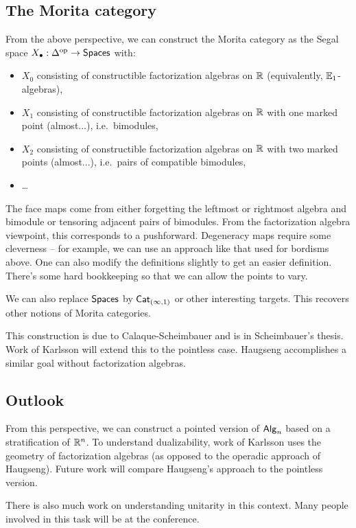 \subsection{The Morita category}

From the above perspective, we can construct the Morita category as the Segal space $X_\bullet: \Delta^{\mathrm{op}} \to \mathsf{Spaces}$ with:
\begin{itemize}
	\item $X_0$ consisting of constructible factorization algebras on $\mathbb{R}$ (equivalently, $\mathbb{E}_1$-algebras),
	\item $X_1$ consisting of constructible factorization algebras on $\mathbb{R}$ with one marked point (almost...), i.e.\ bimodules,
	\item $X_2$ consisting of constructible factorization algebras on $\mathbb{R}$ with two marked points (almost...), i.e.\ pairs of compatible bimodules,
	\item \dots
\end{itemize}
The face maps come from either forgetting the leftmost or rightmost algebra and bimodule or tensoring adjacent pairs of bimodules.
From the factorization algebra viewpoint, this corresponds to a pushforward.
Degeneracy maps require some cleverness -- for example, we can use an approach like that used for bordisms above.
One can also modify the definitions slightly to get an easier definition.
There's some hard bookkeeping so that we can allow the points to vary.

We can also replace $\mathsf{Spaces}$ by $\mathsf{Cat}_{(\infty,1)}$ or other interesting targets.
This recovers other notions of Morita categories.

This construction is due to Calaque-Scheimbauer and is in Scheimbauer's thesis.
Work of Karlsson will extend this to the pointless case.
Haugseng accomplishes a similar goal without factorization algebras.

\subsection{Outlook}

From this perspective, we can construct a pointed version of $\mathsf{Alg}_n$ based on a stratification of $\mathbb{R}^n$.
To understand dualizability, work of Karlsson uses the geometry of factorization algebras (as opposed to the operadic approach of Haugseng).
Future work will compare Haugseng's approach to the pointless version.

There is also much work on understanding unitarity in this context.
Many people involved in this task will be at the conference.

